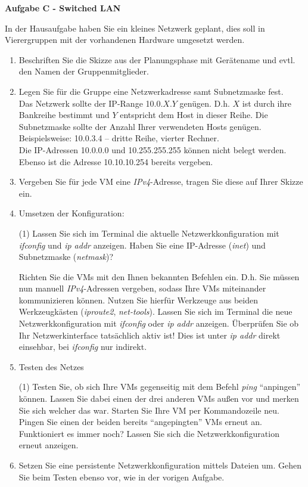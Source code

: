 \documentclass[paper=a4,fontsize=11pt]{scrartcl}%
\numberwithin{equation}{section}
\begin{document}
\begin{center}\Large{\textbf{Aufgabe C - Switched LAN}}\end{center}\vskip0.25in
In der Hausaufgabe haben Sie ein kleines Netzwerk geplant, dies soll in Vierergruppen mit der vorhandenen Hardware umgesetzt werden.
\begin{enumerate}
	\item Beschriften Sie die Skizze aus der Planungsphase mit Gerätename und evtl. den Namen der Gruppenmitglieder.
	\item Legen Sie für die Gruppe eine Netzwerkadresse samt Subnetzmaske fest.\\
	Das Netzwerk sollte der IP-Range 10.0.$X.Y$ genügen. D.h. $X$ ist durch ihre Bankreihe bestimmt und $Y$ entspricht dem Host in dieser  Reihe. Die Subnetzmaske sollte der Anzahl Ihrer verwendeten Hosts genügen.\\
	Beispielsweise: 10.0.3.4 -- dritte Reihe, vierter Rechner.\\
	Die IP-Adressen 10.0.0.0 und 10.255.255.255 können nicht belegt werden. Ebenso ist die Adresse 10.10.10.254 bereits vergeben.
	\item Vergeben Sie für jede VM eine \emph{IPv4}-Adresse, tragen Sie diese auf Ihrer Skizze ein.
	\item Umsetzen der Konfiguration:
\begin{tasks}(1)
	\task Lassen Sie sich im Terminal die aktuelle Netzwerkkonfiguration mit \emph{ifconfig} und \emph{ip addr} anzeigen. Haben Sie eine IP-Adresse (\emph{inet}) und Subnetzmaske (\emph{netmask})?
	
	\task Richten Sie die VMs mit den Ihnen bekannten Befehlen ein. D.h. Sie müssen nun manuell \emph{IPv4}-Adressen vergeben, sodass Ihre VMs miteinander kommunizieren können. Nutzen Sie hierfür Werkzeuge aus beiden Werkzeugkästen (\emph{iproute2}, \emph{net-tools}).
	\task Lassen Sie sich im Terminal die neue Netzwerkkonfiguration mit \emph{ifconfig} oder \emph{ip addr} anzeigen.
	\task Überprüfen Sie ob Ihr Netzwerkinterface tatsächlich aktiv ist! Dies ist unter \emph{ip addr} direkt einsehbar, bei \emph{ifconfig} nur indirekt.
\end{tasks}
\item Testen des Netzes
\begin{tasks}(1)
	\task Testen Sie, ob sich Ihre VMs gegenseitig mit dem Befehl \emph{ping} \enquote{anpingen} können. Lassen Sie dabei einen der drei anderen VMs außen vor und merken Sie sich welcher das war.
	\task Starten Sie Ihre VM per Kommandozeile neu. Pingen Sie einen der beiden bereits \enquote{angepingten} VMs erneut an. Funktioniert es immer noch?
	\task Lassen Sie sich die Netzwerkkonfiguration erneut anzeigen.
\end{tasks}
	\item Setzen Sie eine persistente Netzwerkkonfiguration mittels Dateien um. Gehen Sie beim Testen ebenso vor, wie in der vorigen Aufgabe.
\end{enumerate}
\end{document}
